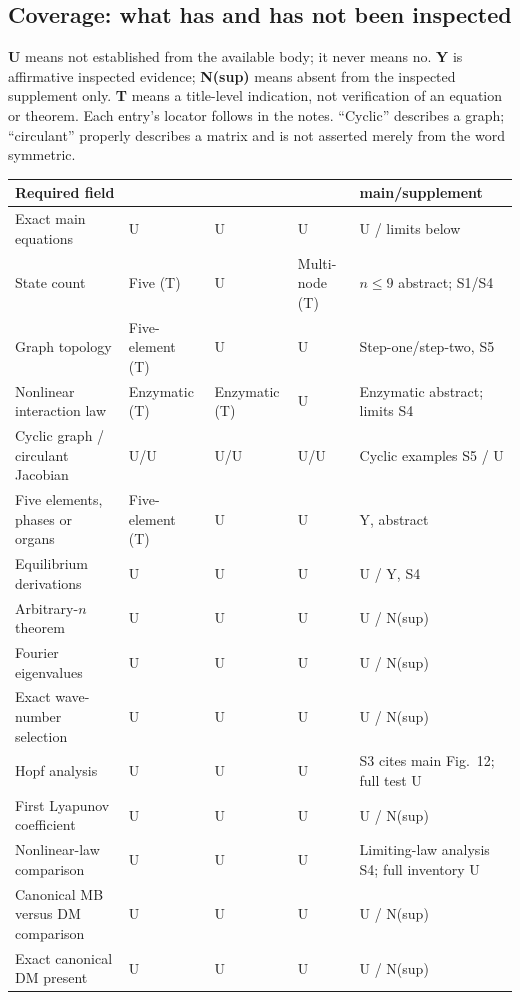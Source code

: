 \subsection{Coverage: what has and has not been inspected}
\textbf{U} means not established from the available body; it never means no.
\textbf{Y} is affirmative inspected evidence; \textbf{N(sup)} means absent
from the inspected supplement only. \textbf{T} means a title-level indication,
not verification of an equation or theorem. Each entry's locator follows in
the notes. ``Cyclic'' describes a graph; ``circulant'' properly describes a
matrix and is not asserted merely from the word symmetric.

\begin{longtable}{>{\raggedright\arraybackslash}p{}>{\raggedright\arraybackslash}p{}>{\raggedright\arraybackslash}p{}>{\raggedright\arraybackslash}p{}>{\raggedright\arraybackslash}p{}}
\toprule Required field & 2021 & 2022 & 2023 & 2024 main/supplement \\
\midrule\endhead
Exact main equations & U & U & U & U / limits below \\
State count & Five (T) & U & Multi-node (T) & $n\le9$ abstract; S1/S4 \\
Graph topology & Five-element (T) & U & U & Step-one/step-two, S5 \\
Nonlinear interaction law & Enzymatic (T) & Enzymatic (T) & U & Enzymatic abstract; limits S4 \\
Cyclic graph / circulant Jacobian & U/U & U/U & U/U & Cyclic examples S5 / U \\
Five elements, phases or organs & Five-element (T) & U & U & Y, abstract \\
Equilibrium derivations & U & U & U & U / Y, S4 \\
Arbitrary-$n$ theorem & U & U & U & U / N(sup) \\
Fourier eigenvalues & U & U & U & U / N(sup) \\
Exact wave-number selection & U & U & U & U / N(sup) \\
Hopf analysis & U & U & U & S3 cites main Fig.~12; full test U \\
First Lyapunov coefficient & U & U & U & U / N(sup) \\
Nonlinear-law comparison & U & U & U & Limiting-law analysis S4; full inventory U \\
Canonical MB versus DM comparison & U & U & U & U / N(sup) \\
Exact canonical DM present & U & U & U & U / N(sup) \\
\bottomrule
\end{longtable}

